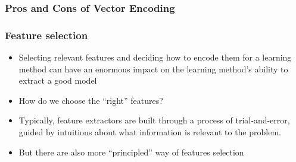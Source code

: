\begin{frame}[fragile]\frametitle{Pros and Cons of Vector Encoding}
\hfill
{}

\end{frame}



\begin{frame}[fragile]
  \frametitle{Feature selection}
\begin{itemize}
\item Selecting relevant features and deciding how to encode them for a learning method can have an enormous impact on the learning method's ability to extract a good model
\item How do we choose the ``right'' features?
\item Typically, feature extractors are built through a process of trial-and-error, guided by intuitions about what information is relevant to the problem. 
\item But there are also more ``principled'' way of features selection 

\end{itemize}
\end{frame}

